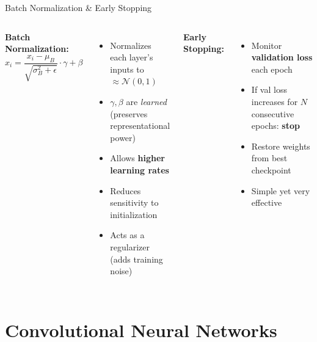 \documentclass[aspectratio=169]{beamer}
\begin{document}
\begin{frame}{Batch Normalization \& Early Stopping}

\begin{columns}
\textbf{Batch Normalization:}
\[
\hat{x}_i = \frac{x_i - \mu_B}{\sqrt{\sigma_B^2 + \epsilon}} \cdot \gamma + \beta
\]

\vspace{0.2cm}
\begin{itemize}
    \item Normalizes each layer's inputs to $\approx \mathcal{N}(0,1)$
    \item $\gamma, \beta$ are \emph{learned} (preserves representational power)
    \item Allows \textbf{higher learning rates}
    \item Reduces sensitivity to initialization
    \item Acts as a regularizer (adds training noise)
\end{itemize}

\textbf{Early Stopping:}

\vspace{0.2cm}
\begin{itemize}
    \item Monitor \textbf{validation loss} each epoch
    \item If val loss increases for $N$ consecutive epochs: \textbf{stop}
    \item Restore weights from best checkpoint
    \item Simple yet very effective
\end{itemize}

\vspace{0.3cm}
\end{columns}
\end{frame}

\section{Convolutional Neural Networks}
\end{document}
